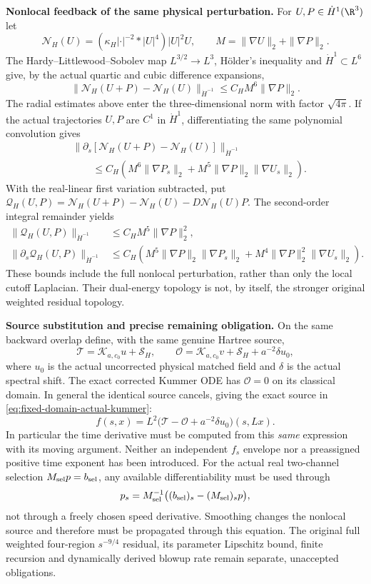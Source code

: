 \medskip
\noindent\textbf{Nonlocal feedback of the same physical perturbation.}
For $U,P\in\dot H^1(\R^3)$ let
\[
 \mathcal N_H(U)=(\kappa_H|\cdot|^{-2}*|U|^4)|U|^2U,\qquad
 M=\|\nabla U\|_2+\|\nabla P\|_2.
\]
The Hardy--Littlewood--Sobolev map $L^{3/2}\to L^3$, H\"older's
inequality and $\dot H^1\subset L^6$ give, by the actual quartic and
cubic difference expansions,
\[
 \|\mathcal N_H(U+P)-\mathcal N_H(U)\|_{\dot H^{-1}}
 \le C_H M^6\|\nabla P\|_2.
\]
The radial estimates above enter the three-dimensional norm with factor
$\sqrt{4\pi}$.  If the actual trajectories $U,P$ are $C^1$ in
$\dot H^1$, differentiating the same polynomial convolution gives
\begin{align*}
 &\|\partial_s[\mathcal N_H(U+P)-\mathcal N_H(U)]\|_{\dot H^{-1}}\\
 &\qquad\le C_H\left(
 M^6\|\nabla P_s\|_2+
 M^5\|\nabla P\|_2\|\nabla U_s\|_2\right).
\end{align*}
With the real-linear first variation subtracted, put
$\mathcal Q_H(U,P)=\mathcal N_H(U+P)-\mathcal N_H(U)-D\mathcal N_H(U)P$.
The second-order integral remainder yields
\begin{align*}
 \|\mathcal Q_H(U,P)\|_{\dot H^{-1}}
 &\le C_H M^5\|\nabla P\|_2^2,\\
 \|\partial_s\mathcal Q_H(U,P)\|_{\dot H^{-1}}
 &\le C_H\left(
 M^5\|\nabla P\|_2\|\nabla P_s\|_2+
 M^4\|\nabla P\|_2^2\|\nabla U_s\|_2\right).
\end{align*}
These bounds include the full nonlocal perturbation, rather than only
the local cutoff Laplacian.  Their dual-energy topology is not, by
itself, the stronger original weighted residual topology.

\medskip
\noindent\textbf{Source substitution and precise remaining obligation.}
On the same backward overlap define, with the same genuine Hartree source,
\[
 \mathcal T=\mathcal K_{a,c_0}u+\mathcal S_H,\qquad
 \mathcal O=\mathcal K_{a,c_0}v+\mathcal S_H+a^{-2}\delta u_0,
\]
where $u_0$ is the actual uncorrected physical matched field and
$\delta$ is the actual spectral shift.  The exact corrected Kummer ODE
has $\mathcal O=0$ on its classical domain.  In general the identical
source cancels, giving the exact source in
\eqref{eq:fixed-domain-actual-kummer}:
\[
 f(s,x)=L^2\bigl(\mathcal T-\mathcal O+a^{-2}\delta u_0\bigr)(s,Lx).
\]
In particular the time derivative must be computed from this \emph{same}
expression with its moving argument.  Neither an independent $f_s$
envelope nor a preassigned positive time exponent has been introduced.
For the actual real two-channel selection $M_{\rm sel}p=b_{\rm sel}$,
any available differentiability must be used through
\[
 p_s=M_{\rm sel}^{-1}\bigl((b_{\rm sel})_s-(M_{\rm sel})_s p\bigr),
\]
not through a freely chosen speed derivative.  Smoothing changes the
nonlocal source and therefore must be propagated through this equation.
The original full weighted four-region $s^{-9/4}$ residual, its parameter
Lipschitz bound, finite recursion and dynamically derived blowup rate
remain separate, unaccepted obligations.

